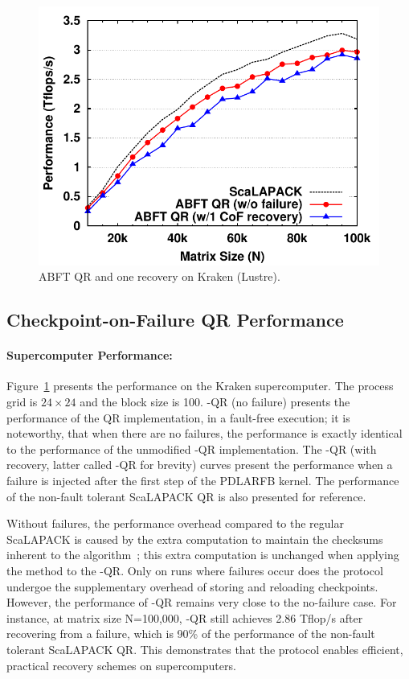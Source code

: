 \begin{figure}[thb]
\centering
	\includegraphics[scale=.6]{figures/kraken_new_data}
	\caption{ABFT QR and one \cof recovery on Kraken (Lustre).}%
	\label{fig:kraken_performance}	
\end{figure}

\subsection{Checkpoint-on-Failure QR Performance}

\paragraph*{Supercomputer Performance:}
Figure~\ref{fig:kraken_performance} presents the performance on the
Kraken supercomputer. The process grid is $24\times 24$ and the block size
is 100. \abft-QR (no failure) presents the performance of the \cof QR
implementation, in a fault-free execution; it is noteworthy, that when
there are no failures, the performance is exactly identical to the
performance of the unmodified \abft-QR implementation. The \abft-QR (with
\cof recovery, latter called \cof-QR for brevity) curves present the performance when a failure is injected after
the first step of the PDLARFB kernel. The performance of the non-fault
tolerant ScaLAPACK QR is also presented for reference.

Without failures, the performance overhead compared to the regular
ScaLAPACK is caused by the extra computation to maintain the checksums inherent to the \abft
algorithm~\cite{pengduppopp12}; this extra computation is unchanged 
when applying the \cof method to the \abft-QR. 
Only on runs where failures occur does the \cof protocol
undergoe the supplementary overhead of storing and reloading
checkpoints. However, the performance of \cof-QR remains very
close to the no-failure case. For instance, at matrix size N=100,000,
\cof-QR still achieves 2.86 Tflop/s after recovering from a failure,
which is 90\% of the performance of the non-fault tolerant ScaLAPACK QR.
This demonstrates that the \cof protocol enables efficient, practical
recovery schemes on supercomputers.


